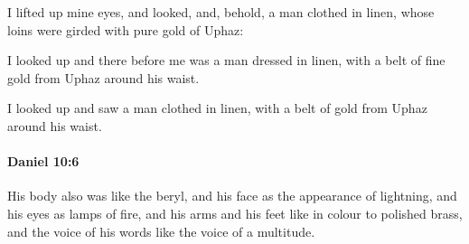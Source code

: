 			\begin{versebox}
					\item[BHS] 
					\item[LXX] 
					\item[ASV] I lifted up mine eyes, and looked, and, behold, a man clothed in linen, whose loins were girded with pure gold of Uphaz:
					\item[NIV] I looked up and there before me was a man dressed in linen, with a belt of fine gold from Uphaz around his waist.
					\item[NRSV] I looked up and saw a man clothed in linen, with a belt of gold from Uphaz around his waist.
			\end{versebox}

		\paragraph{Daniel 10:6} %
			\label{DANIEL-10-6}

			His body also was like the beryl, and his face as the appearance of lightning, and his eyes as lamps of fire, and his arms and his feet like in colour to polished brass, and the voice of his words like the voice of a multitude.


